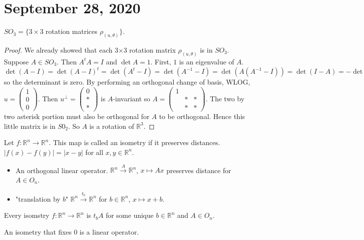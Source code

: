 \documentclass{article}
\newcommand{\R}{\mathbb{R}}
\newcommand{\ra}[1][]{\xrightarrow{#1}}
\begin{document}
\section{September 28, 2020}
\begin{theorem}
$SO_3=\{3\times 3$ rotation matrices $\rho_{(u,\theta)}\}$. 
\end{theorem}
\begin{proof}
We already showed that each 3$\times$3 rotation matrix $\rho_{(u,\theta)}$ is in $SO_3$. Suppose $A\in SO_3$. Then $A^tA=I$ and $\det A=1$. First, $1$ is an eigenvalue of $A$.  $\det(A-I)=\det(A-I)^t=\det(A^t-I)=\det(A^{-1}-I)=\det(A(A^{-1}-I))=\det(I-A)=-\det(A-I)$ so the determinant is zero. By performing an orthogonal change of basis, WLOG, $u=\begin{pmatrix}
1\\0\\0
\end{pmatrix}.$ Then $u^\perp=\begin{pmatrix}
0\\*\\*
\end{pmatrix}$ is $A$-invariant so $A=\begin{pmatrix}
1&&\\&*&*\\&*&*
\end{pmatrix}$. The two by two asterisk portion must also be orthogonal for $A$ to be orthogonal. Hence this little matrix is in $S0_2$. So $A$ is a rotation of $\R^3$. 
\end{proof}
\begin{definition}
Let $f:\R^n\ra\R^n$. This map is called an isometry if it preserves distances. $|f(x)-f(y)|=|x-y|$ for all $x,y\in \R^n$. 
\end{definition}
\begin{example}
\begin{itemize}
    \item An orthogonal linear operator. $\R^n\ra[A]\R^n$, $x\mapsto Ax$ preserves distance for $A\in O_n$.
    \item "translation by $b$" $\R^n\ra[t_b]\R^n$ for $b\in \R^n$, $x\mapsto x+b$. 
\end{itemize}
\end{example}
\begin{theorem}
Every isomstry $f:\R^n\ra\R^n$ is $t_bA$ for some unique $b\in \R^n$ and $A\in O_n$. 
\end{theorem}
\begin{lemma}
An isometry that fixes 0 is a linear operator.
\end{lemma}
\end{document}
